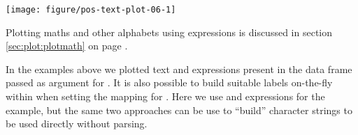 \documentclass[krantz2]{krantz}\usepackage{knitr}%
\begin{document}
\begin{knitrout}\footnotesize
{}\color{fgcolor}\begin{kframe}
\begin{alltt}
    \hlopt{+}
  \hlstd{(} \hlstd{=} \hlopt{-}\hlstd{,}  \hlstd{=} \hlstd{,}  \hlstd{=} \hlstd{)} \hlopt{+}
  \hlstd{()}
\end{alltt}
\end{kframe}

{\centering \texttt{[image: figure/pos-text-plot-06-1]} 

}



\end{knitrout}

Plotting maths and other alphabets using \Rlang expressions is discussed in section \ref{sec:plot:plotmath} on page \pageref{sec:plot:plotmath}.

In the examples above we plotted text and expressions present in the data frame passed as argument for . It is also possible to build suitable labels on-the-fly within  when setting the mapping for . Here we use  and expressions for the example, but the same two approaches can be use to ``build'' character strings to be used directly without parsing.

\begin{knitrout}\footnotesize
{}\color{fgcolor}\begin{kframe}
\begin{alltt}
 \hlkwb{<-}
  \hlstd{(} \hlstd{=} \hlopt{:}\hlstd{,}  \hlstd{=} \hlstd{(}\hlstd{,} \hlstd{))}

 
                     \hlstd{=} \hlstd{(}\hlstr{"alpha["} \hlstr{"]"}\hlstd{,}  \hlstd{=} \hlstd{)))} \hlopt{+}
  \hlstd{(} \hlstd{=} \hlopt{-}\hlstd{,}  \hlstd{=} \hlstd{,}  \hlstd{=} \hlstd{)} \hlopt{+}
  \hlstd{()}
\end{alltt}
\end{kframe}
\end{knitrout}
\end{document}
